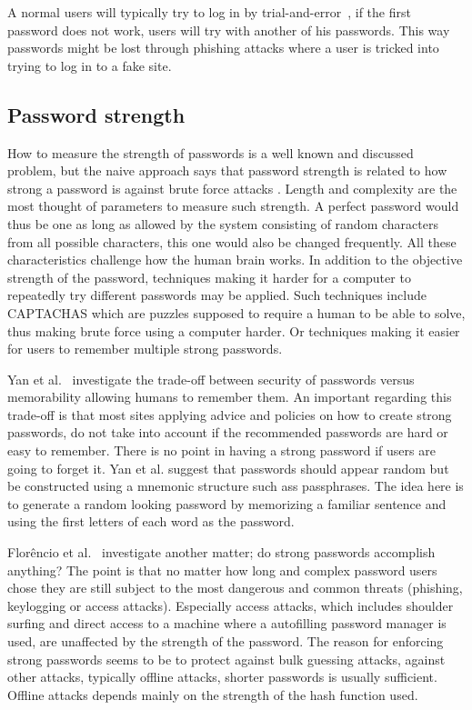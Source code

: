 \par A normal users will typically try to log in by trial-and-error~\cite{single-pw-auth}, if the first password does not work, users will try with another of his passwords. This way passwords might be lost through phishing attacks where a user is tricked into trying to log in to a fake site. 

\subsection{Password strength}\label{password-strength}
How to measure the strength of passwords is a well known and discussed problem, but the naive approach says that password strength is related to how strong a password is against brute force attacks \cite{password-strength}. Length and complexity are the most thought of parameters to measure such strength. A perfect password would thus be one as long as allowed by the system consisting of random characters from all possible characters, this one would also be changed frequently. All these characteristics challenge how the human brain works. In addition to the objective strength of the password, techniques making it harder for a computer to repeatedly try different passwords may be applied. Such techniques include CAPTACHAS \cite{captcha} which are puzzles supposed to require a human to be able to solve, thus making brute force using a computer harder. Or techniques making it easier for users to remember multiple strong passwords.
\par Yan et al.~\cite{memorability_yan} investigate the trade-off between security of passwords versus memorability allowing humans to remember them. An important regarding this trade-off is that most sites applying advice and policies on how to create strong passwords, do not take into account if the recommended passwords are hard or easy to remember. There is no point in having a strong password if users are going to forget it. Yan et al. suggest that passwords should appear random but be constructed using a  mnemonic structure such ass passphrases. The idea here is to generate a random looking password by memorizing a familiar sentence and using the first letters of each word as the password. 
\par Florêncio et al.~\cite{strong-pws_florencio} investigate another matter; do strong passwords accomplish anything? The point is that no matter how long and complex password users chose they are still subject to the most dangerous and common threats (phishing, keylogging or access attacks). Especially access attacks, which includes shoulder surfing and direct access to a machine where a autofilling password manager is used, are unaffected by the strength of the password.  The reason for enforcing strong passwords seems to be to protect against bulk guessing attacks, against other attacks, typically offline attacks, shorter passwords is usually sufficient. Offline attacks depends mainly on the strength of the hash function used.

